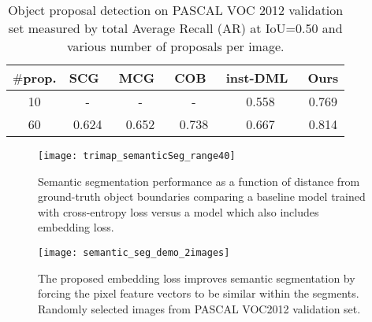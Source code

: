 \documentclass[10pt,twocolumn,letterpaper]{article}
\begin{document}
{
\setlength{\tabcolsep}{0.25em}
\begin{table}%
\centering
{\footnotesize
\begin{tabular}{c | c c c  c |  c  }
\hline
 $\#$prop. & SCG~\cite{pont2017multiscale}
                     & MCG~\cite{pont2017multiscale}
                     & COB~\cite{maninis2017convolutional}
                     & inst-DML~\cite{fathi2017semantic}
                     & Ours      \\
\hline
10               & -            & -         & -     &  0.558     & 0.769 \\
60               & 0.624        & 0.652     & 0.738 &  0.667     & 0.814 \\
\hline
\end{tabular}
}
\vspace{-3mm}
\caption{Object proposal detection on PASCAL VOC 2012 validation set measured
by total Average Recall (AR) at IoU=0.50 and various number of proposals per image.}
\vspace{-2mm}
\label{tab:objProposalDet}
\end{table}
}\begin{figure}[t]
\centering
   \texttt{[image: trimap\_semanticSeg\_range40]} %
   \vspace{-2mm}
   \caption{Semantic segmentation performance as a function of distance from ground-truth
   object boundaries comparing a baseline model trained with cross-entropy loss versus a
   model which also includes embedding loss.
   }
\label{fig:trimap_semanticSeg}
\vspace{-1mm}
\end{figure}\begin{figure}[t]
\centering
   \texttt{[image: semantic\_seg\_demo\_2images]} %
   \vspace{-5mm}
   \caption{The proposed embedding loss improves semantic segmentation by
   forcing the pixel feature vectors to be similar within the segments.
   Randomly selected images from PASCAL VOC2012 validation set.}
\label{fig:semantic_seg_demo}
\vspace{-3mm}
\end{figure}\begin{figure*}[ht]

\end{figure*}
\end{document}
